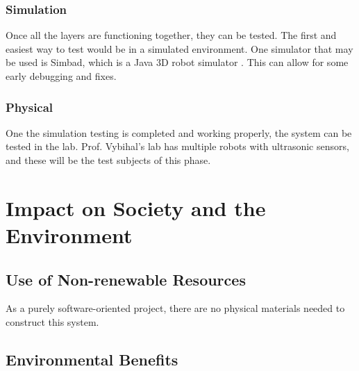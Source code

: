 \documentclass[titlepage,11pt]{article}
\begin{document}
\subsubsection{Simulation}

Once all the layers are functioning together, they can be tested. The first and easiest way to test would be in a simulated environment. One simulator that may be used is Simbad, which is a Java 3D robot simulator \cite{simbad}. This can allow for some early debugging and fixes.

\subsubsection{Physical}

One the simulation testing is completed and working properly, the system can be tested in the lab. Prof. Vybihal's lab has multiple robots with ultrasonic sensors, and these will be the test subjects of this phase.

\section{Impact on Society and the Environment}


\subsection{Use of Non-renewable Resources}

As a purely software-oriented project, there are no physical materials needed to construct this system.

\subsection{Environmental Benefits}
\end{document}
